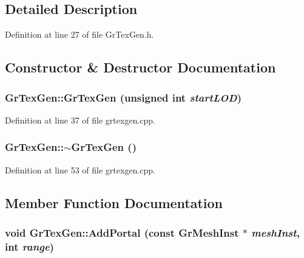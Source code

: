 \subsection{Detailed Description}


Definition at line 27 of file GrTexGen.h.

\subsection{Constructor \& Destructor Documentation}
\hypertarget{class_gr_tex_gen_654355d0d9ad9c48abe0dff18787b7c3}{
\subsubsection[{GrTexGen}]{\setlength{\rightskip}{0pt plus 5cm}GrTexGen::GrTexGen (unsigned int {\em startLOD})}}
\label{class_gr_tex_gen_654355d0d9ad9c48abe0dff18787b7c3}




Definition at line 37 of file grtexgen.cpp.\hypertarget{class_gr_tex_gen_b90bc3244b7902ec2e8e074bc45f37b7}{
\subsubsection[{$\sim$GrTexGen}]{\setlength{\rightskip}{0pt plus 5cm}GrTexGen::$\sim$GrTexGen ()}}
\label{class_gr_tex_gen_b90bc3244b7902ec2e8e074bc45f37b7}




Definition at line 53 of file grtexgen.cpp.

\subsection{Member Function Documentation}
\hypertarget{class_gr_tex_gen_795148634523ef076d51e58e1e7a8ace}{
\subsubsection[{AddPortal}]{\setlength{\rightskip}{0pt plus 5cm}void GrTexGen::AddPortal (const {\bf GrMeshInst} $\ast$ {\em meshInst}, \/  int {\em range})}}
\label{class_gr_tex_gen_795148634523ef076d51e58e1e7a8ace}




